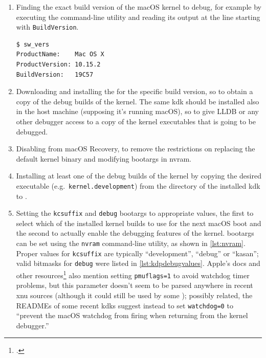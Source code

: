 \begin{enumerate}
    \item Finding the exact build version of the macOS kernel to debug, for example by executing the  command-line utility and reading its output at the line starting with \lstinline{BuildVersion}.
\begin{lstlisting}[style=out,language=bash,caption={Example output of the \protect\path{/usr/bin/sw_vers} utility}]
$ sw_vers
ProductName:	Mac OS X
ProductVersion:	10.15.2
BuildVersion:	19C57
\end{lstlisting}

    \item Downloading and installing the  for the specific build version, so to obtain a copy of the debug builds of the kernel. The same \gls{kdk} should be installed also in the host machine (supposing it's running macOS), so to give LLDB or any other debugger access to a copy of the kernel executables that is going to be debugged.

    \item Disabling  from macOS Recovery, to remove the restrictions on replacing the default kernel binary and modifying \glspl{bootarg} in \gls{nvram}.

    \item Installing at least one of the debug builds of the kernel by copying the desired executable (e.g.\ \lstinline{kernel.development}) from the directory of the installed \gls{kdk} to .

    \item Setting the \lstinline{kcsuffix} and \lstinline{debug} \glspl{bootarg} to appropriate values, the first to select which of the installed kernel builds to use for the next macOS boot and the second to actually enable the debugging features of the kernel. \Glspl{bootarg} can be set using the \lstinline{nvram} command-line utility, as shown in \cref{lst:nvram}. Proper values for \lstinline{kcsuffix} are typically \enquote{development}, \enquote{debug} or \enquote{kasan}; valid bitmasks for \lstinline{debug} were listed in \cref{lst:kdpdebugvalues}. Apple's docs and other resources\footcite{DarwinDoc1,MacOSDebug10} also mention setting \lstinline{pmuflags=1} to avoid watchdog timer problems, but this parameter doesn't seem to be parsed anywhere in recent \gls{xnu} sources (although it could still be used by some ); possibly related, the READMEs of some recent \glspl{kdk} suggest instead to set \lstinline{watchdog=0} to \enquote{prevent the macOS watchdog from firing when returning from the kernel debugger.}


\end{enumerate}
